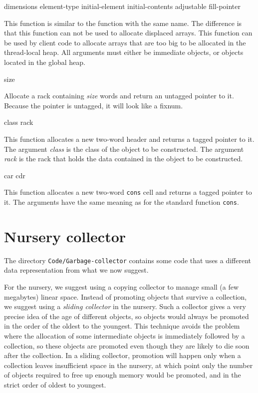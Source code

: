  {dimensions \key element-type initial-element
  initial-contents adjustable fill-pointer}

This function is similar to the \commonlisp{} function with the same
name.  The difference is that this function can not be used to
allocate displaced arrays.  This function can be used by client code
to allocate arrays that are too big to be allocated in the
thread-local heap.  All arguments must either be immediate objects, or
objects located in the global heap.

 {size}

Allocate a rack containing \textit{size} words and return an untagged
pointer to it.  Because the pointer is untagged, it will look like a
fixnum.

 {class rack}

This function allocates a new two-word header and returns a tagged
pointer to it.  The argument \textit{class} is the class of the object
to be constructed.  The argument \textit{rack} is the rack that holds
the data contained in the object to be constructed.

 {car cdr}

This function allocates a new two-word \texttt{cons} cell and returns
a tagged pointer to it.  The arguments have the same meaning as for
the standard \commonlisp{} function \texttt{cons}.

\section{Nursery collector}
The directory \texttt{Code/Garbage-collector} contains some code that
uses a different data representation from what we now suggest.  

For the nursery, we suggest using a copying collector to manage small
(a few megabytes) linear space.  Instead of promoting objects that
survive a collection, we suggest using a \emph{sliding collector} in
the nursery.  Such a collector gives a very precise idea of the age of
different objects, so objects would always be promoted in the order of
the oldest to the youngest.  This technique avoids the problem where
the allocation of some intermediate objects is immediately followed by
a collection, so these objects are promoted even though they are
likely to die soon after the collection.  In a sliding collector,
promotion will happen only when a collection leaves insufficient space
in the nursery, at which point only the number of objects required to
free up enough memory would be promoted, and in the strict order of
oldest to youngest.

